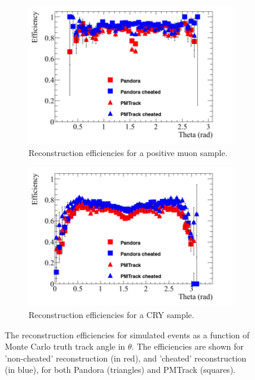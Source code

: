 \begin{figure}[h!]
  \centering
  \begin{subfigure}{0.48\textwidth}
    \centering
    \includegraphics[width=\textwidth]{Effic_AntiMuon_500V_All_Theta}
    \caption{Reconstruction efficiencies for a positive muon sample.}
    \label{fig:SimEffic_Theta_AMu}
  \end{subfigure}%
  \hspace{0.03\textwidth}%
  \begin{subfigure}{0.48\textwidth}
    \centering
    \includegraphics[width=\textwidth]{Effic_Cosmics_500V_All_Theta}
    \caption{Reconstruction efficiencies for a CRY sample.}
    \label{fig:SimEffic_Theta_CRY}
  \end{subfigure}
  \caption[The reconstruction efficiencies for simulated events as a function of Monte Carlo truth track angle in $\theta$.]
          {The reconstruction efficiencies for simulated events as a function of Monte Carlo truth track angle in $\theta$. The efficiencies are shown for 'non-cheated' reconstruction (in red), and 'cheated' reconstruction (in blue), for both Pandora (triangles) and PMTrack (squares).}
          \label{fig:SimEffic_Theta}
\end{figure}

